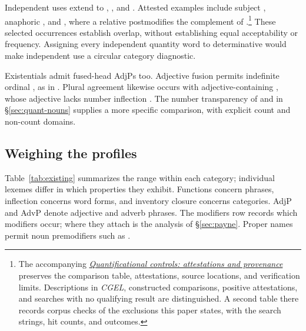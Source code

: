 \documentclass[12pt]{article}
\begin{document}
Independent uses extend to , , and . Attested examples include subject , anaphoric , and , where a relative postmodifies the complement of .\footnote{The accompanying \href{run:quantifier-controls.pdf}{\textit{Quantificational controls: attestations and provenance}} preserves the comparison table, attestations, source locations, and verification limits. Descriptions in \textit{CGEL}, constructed comparisons, positive attestations, and searches with no qualifying result are distinguished. A second table there records corpus checks of the exclusions this paper states, with the search strings, hit counts, and outcomes.} These selected occurrences establish overlap, without establishing equal acceptability or frequency. Assigning every independent quantity word to determinative would make independent use a circular category diagnostic.

Existentials admit fused-head AdjPs too. Adjective fusion permits indefinite ordinal  \citep[416]{huddleston2002}, as in . Plural agreement likewise occurs with adjective-containing , whose adjective lacks number inflection \citep[418]{huddleston2002}. The number transparency of  and  in §\ref{sec:quant-nouns} supplies a more specific comparison, with explicit count and non-count domains.

\subsection{Weighing the profiles}\label{sec:membership}

Table~\ref{tab:existing} summarizes the range within each category; individual lexemes differ in which properties they exhibit. Functions concern phrases, inflection concerns word forms, and inventory closure concerns categories. AdjP and AdvP denote adjective and adverb phrases. The modifiers row records which modifiers occur; where they attach is the analysis of §\ref{sec:payne}. Proper names permit noun premodifiers such as  \citep[520]{huddleston2002}.
\end{document}
